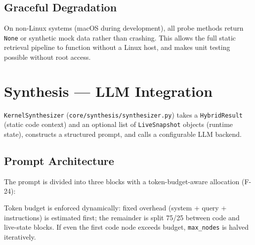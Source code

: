 \documentclass[11pt,a4paper]{article}
\newcommand{\coderef}[1]{\texttt{\small\color{layer2}#1}}
\begin{document}
\subsection{Graceful Degradation}

On non-Linux systems (macOS during development), all probe methods return
\texttt{None} or synthetic mock data rather than crashing. This allows the
full static retrieval pipeline to function without a Linux host, and makes
unit testing possible without root access.

\section{Synthesis --- LLM Integration}
\label{sec:synthesis}

\coderef{KernelSynthesizer} (\texttt{core/synthesis/synthesizer.py}) takes a
\coderef{HybridResult} (static code context) and an optional list of
\coderef{LiveSnapshot} objects (runtime state), constructs a structured prompt,
and calls a configurable LLM backend.

\subsection{Prompt Architecture}

The prompt is divided into three blocks with a token-budget-aware allocation
(F-24):

\begin{center}
\end{center}

\noindent
Token budget is enforced dynamically: fixed overhead (system + query +
instructions) is estimated first; the remainder is split 75/25 between code
and live-state blocks. If even the first code node exceeds budget,
\texttt{max\_nodes} is halved iteratively.
\end{document}

